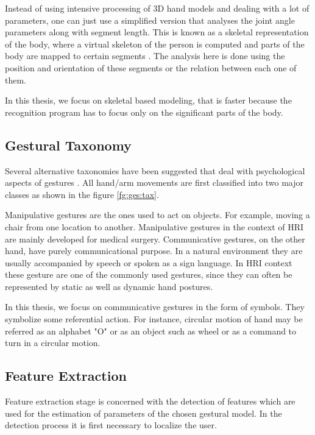 Instead of using intensive processing of 3D hand models and dealing with a lot of parameters, one can just use a simplified version that analyses the joint angle parameters along with segment length. This is known as a skeletal representation of the body, where a virtual skeleton of the person is computed and parts of the body are mapped to certain segments \cite{1}. The analysis here is done using the position and orientation of these segments or the relation between each one of them.

In this thesis, we focus on skeletal based modeling, that is faster because the recognition program has to focus only on the significant parts of the body.

\subsection{Gestural Taxonomy} Several alternative taxonomies have been suggested that deal with psychological aspects of gestures \cite{1}. All hand/arm movements are first classified into two major classes as shown in the figure \ref{fg:ges:tax}.



Manipulative gestures are the ones used to act on objects. For example, moving a chair from one location to another. Manipulative gestures in the context of HRI are mainly developed for medical surgery. Communicative gestures, on the other hand, have purely communicational purpose. In a natural environment they are usually accompanied by speech or spoken as a sign language. In HRI context these gesture are one of the commonly used gestures, since they can often be represented by static as well as dynamic hand postures.

In this thesis, we focus on communicative gestures in the form of symbols. They symbolize some referential action. For instance, circular motion of hand may be referred as an alphabet "O" or as an object such as wheel or as a command to turn in a circular motion.

\subsection{Feature Extraction} Feature extraction stage is concerned with the detection of features which are used for the estimation of parameters of the chosen gestural model. In the detection process it is first necessary to localize the user. 



